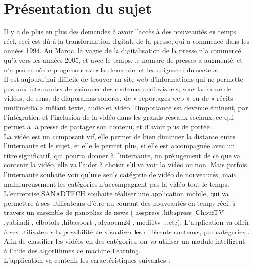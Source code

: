 \section{Présentation du sujet}
Il y a de plus en plus des demandes à avoir l'accès à des nouveautés en temps réel, ceci est dû à la transformation digitale de la presse, qui a commencé dans les années 1994. Au Maroc, la vague de la digitalisation de la presse n'a commencé qu'à vers les années 2005, et avec le temps, le nombre de presses a augmenté, et n'a pas cessé de progresser avec la demande, et les exigences du secteur.\\[0.5cm]
Il est aujourd’hui difficile de trouver un site web d’informations qui ne permette pas aux internautes de visionner des contenus audiovisuels, sous la forme de vidéos, de sons, de diaporamas sonores, de « reportages web » ou de « récits multimédia » mêlant texte, audio et vidéo. l'importance est devenue éminent, par l'intégration et l'inclusion de la vidéo dans les grands réseaux sociaux, ce qui permet à la presse de partager son contenu, et d'avoir plus de portée .\\[0.5cm]
La vidéo est un composant vif, elle permet de bien diminuer la distance entre l'internaute et le sujet, et elle le permet plus, si elle est accompagnée avec un titre significatif, qui pourra donner à l'internaute, un préjugement de ce que va contenir la vidéo, elle va l'aider à choisir s'il va voir la vidéo ou non. Mais parfois, l'internaute souhaite voir qu'une seule catégorie de vidéo de nouveautés, mais malheureusement les catégories n'accompagnent pas la vidéo tout le temps.\\[0.5cm]
L'entreprise SANADTECH souhaite réaliser une application mobile, qui va permettre à ses utilisateurs d'être au courant des nouveautés en temps réel, à travers un ensemble de panoplies de news ( hespress ,hibapress ,ChoufTV ,yabiladi , elbotola ,hibasport , alyaoum24 , medi1tv ...etc). L'application va offrir à ses utilisateurs la possibilité de visualiser les différents contenus, par catégories 	.\\[1cm]
Afin de classifier les vidéos en des catégories, on va utiliser un module intelligent à l'aide  des algorithmes de machine Learning.\\[0.5cm]
L'application va contenir les caractéristiques suivantes :
